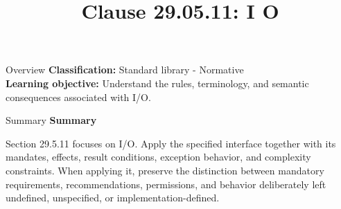 \documentclass[10pt,letterpaper]{article}
\title{Clause 29.05.11: I O}
\author{}
\date{}
\begin{document}
\maketitle
\begin{CornellOverviewBox}{Overview}
\textbf{Classification:} Standard library - Normative\\[2pt]
\textbf{Learning objective:} Understand the rules, terminology, and semantic consequences associated with I/O.
\end{CornellOverviewBox}\begin{CornellSummaryBox}{Summary}
{\sffamily\bfseries\color{Accent} Summary}\par\vspace{3pt}Section 29.5.11 focuses on I/O. Apply the specified interface together with its mandates, effects, result conditions, exception behavior, and complexity constraints. When applying it, preserve the distinction between mandatory requirements, recommendations, permissions, and behavior deliberately left undefined, unspecified, or implementation-defined.
\end{CornellSummaryBox}
\end{document}
